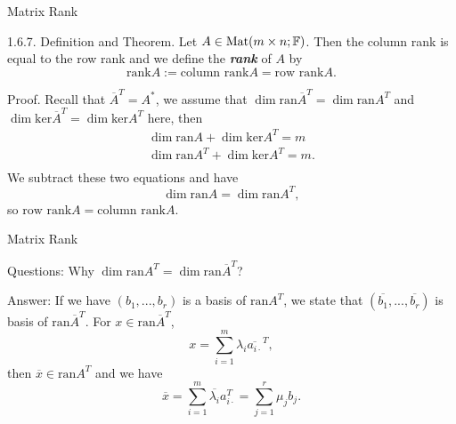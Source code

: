\documentclass[hyperref={pdfpagelabels=true}]{beamer}
\newcommand{\Mat}{\text{Mat}}
\newcommand{\highlightg}[1]{\textcolor[rgb]{0.1,0.5,0.3}{\emph{\textbf{#1}}}}
\newcommand{\<}{\langle}
\renewcommand{\>}{\rangle}
\newenvironment{shrinkeq}[1]%
{ \bgroup
  \addtolength\abovedisplayshortskip{#1}
  \addtolength\abovedisplayskip{#1}
  \addtolength\belowdisplayshortskip{#1}
  \addtolength\belowdisplayskip{#1}}
{\egroup\ignorespacesafterend}
\begin{document}
\begin{frame}{Matrix Rank}
    \begin{block}{1.6.7. Definition and Theorem.}
        Let $A \in \Mat(m \times n;\F)$. Then the column rank is equal to the row rank and we define the \highlightg{rank} of $A$ by
        \begin{shrinkeq}{-0.3em} 
        \[\text{rank} A:=\text{column rank}A = \text{row rank}A.\]
        \end{shrinkeq}
    \end{block}
    \begin{block}{Proof.}
        Recall that $\overline{A}^{T} = A^{*}$, we assume that $\dim \text{ran}\overline{A}^{T} = \dim \text{ran}A^{T}$ and $\dim \text{ker}\overline{A}^{T} = \dim \text{ker}A^{T}$ here, then 
        \begin{shrinkeq}{-0.3em}
        \[
            \begin{aligned}
                \dim \text{ran}A+\dim \text{ker}A^{T} = m\\
                \dim \text{ran}A^{T}+\dim \text{ker}A^{T} = m.\\
            \end{aligned}
        \]
        \end{shrinkeq}
        We subtract these two equations and have
        \begin{shrinkeq}{-0.3em} 
        \[\dim \text{ran}A = \dim \text{ran}A^{T},\]
        \end{shrinkeq}
        so $\text{row rank}A = \text{column rank}A$.
        \end{block}
    \end{frame}
    \begin{frame}{Matrix Rank}
        \begin{block}{Questions:}
            Why $\dim \text{ran}A^{T} = \dim \text{ran}\overline{A}^{T}$?
        \end{block}
        \begin{block}{Answer:}
            If we have $(b_{1},...,b_{r})$ is a basis of $\text{ran}A^{T}$, we state that $(\overline{b_{1}},...,\overline{b_{r}})$ is basis of $\text{ran}\overline{A}^{T}$. For $x \in \text{ran}\overline{A}^{T}$,
            \begin{shrinkeq}{-0.3em}
            \[x = \sum_{i = 1}^{m}\lambda_{i}\overline{a_{i\cdot}}^{T},\]
            \end{shrinkeq}
            then $\overline{x} \in \text{ran}A^{T}$ and we have 
            \[\overline{x} = \sum_{i = 1}^{m}\overline{\lambda_{i}}a_{i\cdot}^{T} = \sum_{j = 1}^{r}\mu_{j}b_{j}.\]
        \end{block}
    \end{frame}
\end{document}
